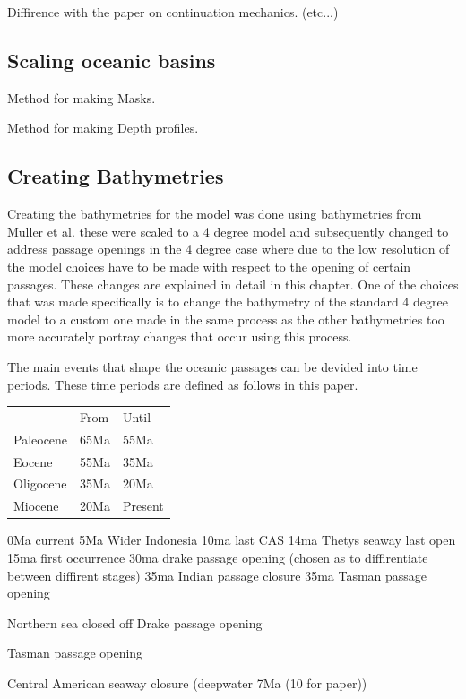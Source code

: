 \documentclass[a4paper]{article}
\begin{document}
\begin{multicols}{2}
Diffirence with the paper on continuation mechanics. (etc...)

\subsection{Scaling oceanic basins}

Method for making Masks.

Method for making Depth profiles.


\subsection{Creating Bathymetries}
Creating the bathymetries for the model was done using bathymetries from Muller et al.\cite{Muller2008Mar} these were scaled to a 4 degree model and subsequently changed to address passage openings in the 4 degree case where due to the low resolution of the model choices have to be made with respect to the opening of certain passages. These changes are explained in detail in this chapter. One of the choices that was made specifically is to change the bathymetry of the standard 4 degree model to a custom one made in the same process as the other bathymetries too more accurately portray changes that occur using this process.

The main events that shape the oceanic passages can be devided into time periods. These time periods are defined as follows in this paper. 

\begin{table}[H]
	\begin{tabular}{lll}
		&From &Until \\
		Paleocene & 65Ma&55Ma    \\
		Eocene    & 55Ma&35Ma     \\
		Oligocene & 35Ma&20Ma    \\
		Miocene   & 20Ma&Present 
	\end{tabular}
\end{table}

0Ma current
5Ma Wider Indonesia
10ma last CAS
14ma Thetys seaway last open 15ma first occurrence
30ma drake passage opening (chosen as to diffirentiate between diffirent stages)
35ma Indian passage closure
35ma Tasman passage opening

Northern sea closed off
Drake passage opening \cite{Scher2006Apr}

Tasman passage opening \cite{Lawver2003Sep}

Central American seaway closure \cite{Molnar2008Jun} (deepwater 7Ma (10 for paper))\cite{Pindell1988Dec}


\end{multicols}
\end{document}
